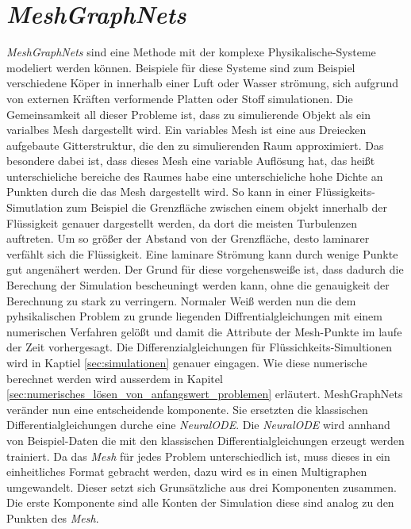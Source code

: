 

\section{\textit{MeshGraphNets}} \label{sec:meshgraphnets}

\textit{MeshGraphNets} \cite{meshgraphnets} sind eine Methode mit der komplexe Physikalische-Systeme modeliert werden können.
Beispiele für diese Systeme sind zum Beispiel verschiedene Köper in innerhalb einer Luft oder Wasser strömung, 
sich aufgrund von externen Kräften verformende Platten oder Stoff simulationen.
Die Gemeinsamkeit all dieser Probleme ist, dass zu simulierende Objekt als ein varialbes Mesh dargestellt wird.
Ein variables Mesh ist eine aus Dreiecken aufgebaute Gitterstruktur, die den zu simulierenden Raum approximiert.
Das besondere dabei ist, dass dieses Mesh eine variable Auflösung hat, das heißt unterschieliche bereiche des Raumes 
habe eine unterschieliche hohe Dichte an Punkten durch die das Mesh dargestellt wird.
So kann in einer Flüssigkeits-Simutlation zum Beispiel die Grenzfläche zwischen einem objekt innerhalb der Flüssigkeit
genauer dargestellt werden, da dort die meisten Turbulenzen auftreten.
Um so größer der Abstand von der Grenzfläche, desto laminarer verfählt sich die Flüssigkeit.
Eine laminare Strömung kann durch wenige Punkte gut angenähert werden.
Der Grund für diese vorgehensweiße ist, dass dadurch die Berechung der Simulation bescheuningt werden kann,
ohne die genauigkeit der Berechnung zu stark zu verringern.
Normaler Weiß werden nun die dem pyhsikalischen Problem zu grunde liegenden Diffrentialgleichungen mit einem numerischen Verfahren gelößt 
und damit die Attribute der Mesh-Punkte im laufe der Zeit vorhergesagt.
Die Differenzialgleichungen für Flüssichkeits-Simultionen wird in Kaptiel \ref{sec:simulationen} genauer eingagen.
Wie diese numerische berechnet werden wird ausserdem in Kapitel \ref{sec:numerisches_lösen_von_anfangswert_problemen} erläutert.
MeshGraphNets veränder nun eine entscheidende komponente.
Sie ersetzten die klassischen Differentialgleichungen durche eine \textit{NeuralODE}.
Die \textit{NeuralODE} wird annhand von Beispiel-Daten die mit den klassischen Differentialgleichungen erzeugt werden trainiert.
Da das \textit{Mesh} für jedes Problem unterschiedlich ist, muss dieses in ein einheitliches Format gebracht werden, dazu wird es in einen
Multigraphen umgewandelt.
Dieser setzt sich Grunsätzliche aus drei Komponenten zusammen.
Die erste Komponente sind alle Konten der Simulation diese sind analog zu den Punkten des \textit{Mesh}.
